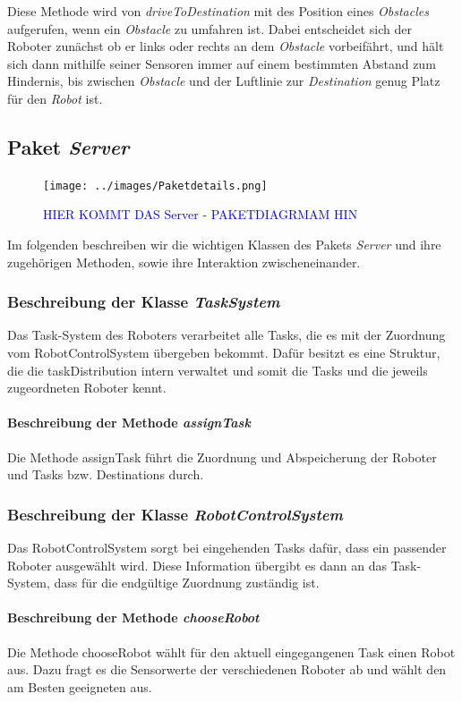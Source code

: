 			Diese Methode wird von \textit{driveToDestination} mit des Position eines \textit{Obstacles} aufgerufen, 
			wenn ein \textit{Obstacle} zu umfahren ist.
			Dabei entscheidet sich der Roboter zunächst ob er links oder rechts an dem \textit{Obstacle} vorbeifährt, 
			und hält sich dann mithilfe seiner Sensoren immer auf einem bestimmten Abstand zum Hindernis, bis zwischen 
			\textit{Obstacle} und der Luftlinie zur \textit{Destination} genug Platz für den \textit{Robot} ist.
	
\subsection{Paket \textit{Server}}
\begin{figure}[H]
	\centering
	\texttt{[image: ../images/Paketdetails.png]}
	\caption{\textcolor{blue}{HIER KOMMT DAS Server - PAKETDIAGRMAM HIN}}
	\label{Paketdetails}
	\end{figure}
	Im folgenden beschreiben wir die wichtigen Klassen des Pakets \textit{Server} 
	und ihre zugehörigen Methoden, sowie ihre Interaktion zwischeneinander. 


	\subsubsection{Beschreibung der Klasse \textit{TaskSystem}}
		Das Task-System des Roboters verarbeitet alle Tasks, die es mit der Zuordnung vom RobotControlSystem übergeben bekommt. Dafür besitzt es eine Struktur, die die taskDistribution intern verwaltet und somit die Tasks und die jeweils zugeordneten Roboter kennt.
		
			\paragraph{Beschreibung der Methode \textit{assignTask}}
			Die Methode assignTask führt die Zuordnung und Abspeicherung der Roboter und Tasks bzw. Destinations durch.
			
	\subsubsection{Beschreibung der Klasse \textit{RobotControlSystem}}
		Das RobotControlSystem sorgt bei eingehenden Tasks dafür, dass ein passender Roboter ausgewählt wird. Diese Information übergibt es dann an das Task-System, dass für die endgültige Zuordnung zuständig ist.
	
			\paragraph{Beschreibung der Methode \textit{chooseRobot}}
			Die Methode chooseRobot wählt für den aktuell eingegangenen Task einen Robot aus. Dazu fragt es die Sensorwerte der verschiedenen Roboter ab und wählt den am Besten geeigneten aus.